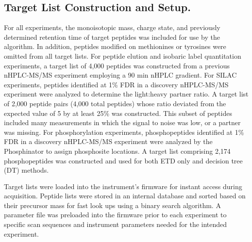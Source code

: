\subsection{Target List Construction and \inseq{} Setup.}
For all experiments, the monoisotopic mass, charge state, and previously determined retention time of target peptides was included for use by the \inseq{} algorithm. In addition, peptides modified on methionines or tyrosines were omitted from all target lists. For peptide elution and isobaric label quantitation \inseq{} experiments, a target list of 4,000 peptides was constructed from a previous nHPLC-MS/MS experiment employing a 90 min nHPLC gradient. For SILAC \inseq{} experiments, peptides identified at 1\% FDR in a discovery nHPLC-MS/MS experiment were analyzed to determine the light:heavy partner ratio. A target list of 2,000 peptide pairs (4,000 total peptides) whose ratio deviated from the expected value of 5 by at least 25\% was constructed. This subset of peptides included many measurements in which the signal to noise was low, or a partner was missing. For phosphorylation \inseq{} experiments, phosphopeptides identified at 1\% FDR in a discovery nHPLC-MS/MS experiment were analyzed by the Phosphinator to assign phosphosite locations. A target list comprising 2,174 phosphopeptides was constructed and used for both ETD only and decision tree (DT) \inseq{} methods.

Target lists were loaded into the instrument's firmware for instant access during acquisition. Peptide lists were stored in an internal database and sorted based on their precursor mass for fast look ups using a binary search algorithm. A parameter file was preloaded into the firmware prior to each experiment to specific scan sequences and instrument parameters needed for the intended experiment.

